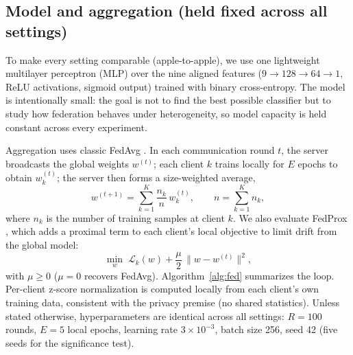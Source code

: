 \documentclass[11pt,a4paper]{article}
\begin{document}
\subsection{Model and aggregation (held fixed across all settings)}
To make every setting comparable (apple-to-apple), we use one lightweight
multilayer perceptron (MLP) over the nine aligned features
(\(9\!\to\!128\!\to\!64\!\to\!1\), ReLU activations, sigmoid output) trained with
binary cross-entropy. The model is intentionally small: the goal is not to find
the best possible classifier but to study how federation behaves under
heterogeneity, so model capacity is held constant across every experiment.

Aggregation uses classic FedAvg \cite{mcmahan}. In each communication round
\(t\), the server broadcasts the global weights \(w^{(t)}\); each client \(k\)
trains locally for \(E\) epochs to obtain \(w_k^{(t)}\); the server then forms a
size-weighted average,
\begin{equation}
w^{(t+1)} = \sum_{k=1}^{K}\frac{n_k}{n}\,w_k^{(t)},\qquad n=\sum_{k=1}^{K} n_k,
\label{eq:fedavg}
\end{equation}
where \(n_k\) is the number of training samples at client \(k\). We also evaluate
FedProx \cite{fedprox}, which adds a proximal term to each client's local
objective to limit drift from the global model:
\begin{equation}
\min_{w}\;\mathcal{L}_k(w) + \frac{\mu}{2}\,\lVert w - w^{(t)}\rVert^2 ,
\label{eq:fedprox}
\end{equation}
with \(\mu \ge 0\) (\(\mu=0\) recovers FedAvg). Algorithm~\ref{alg:fed} summarizes
the loop. Per-client z-score normalization is computed locally from each client's
own training data, consistent with the privacy premise (no shared statistics).
Unless stated otherwise, hyperparameters are identical across all settings:
\(R=100\) rounds, \(E=5\) local epochs, learning rate \(3\times10^{-3}\), batch
size 256, seed 42 (five seeds for the significance test).
\end{document}
